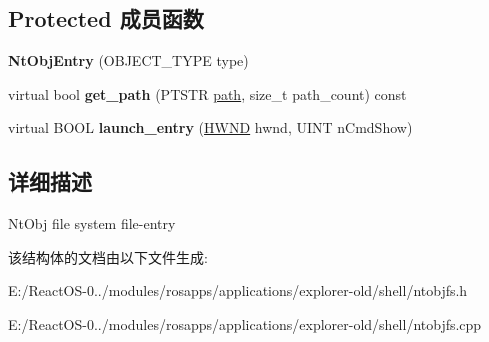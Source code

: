 \subsection*{Protected 成员函数}
\begin{DoxyCompactItemize}
\item 
\mbox{\label{struct_nt_obj_entry_a7ad617b6d6d55a019c480e8453e715b8}} 
{\bfseries Nt\+Obj\+Entry} (O\+B\+J\+E\+C\+T\+\_\+\+T\+Y\+PE type)
\item 
\mbox{\label{struct_nt_obj_entry_a9fe2f521ef737a936804bccd38aa57f4}} 
virtual bool {\bfseries get\+\_\+path} (P\+T\+S\+TR \hyperlink{structpath}{path}, size\+\_\+t path\+\_\+count) const
\item 
\mbox{\label{struct_nt_obj_entry_af3ce908d71093fe99eaf0b498d38ecb9}} 
virtual B\+O\+OL {\bfseries launch\+\_\+entry} (\hyperlink{interfacevoid}{H\+W\+ND} hwnd, U\+I\+NT n\+Cmd\+Show)
\end{DoxyCompactItemize}


\subsection{详细描述}
Nt\+Obj file system file-\/entry 

该结构体的文档由以下文件生成\+:\begin{DoxyCompactItemize}
\item 
E\+:/\+React\+O\+S-\/0../modules/rosapps/applications/explorer-\/old/shell/ntobjfs.\+h\item 
E\+:/\+React\+O\+S-\/0../modules/rosapps/applications/explorer-\/old/shell/ntobjfs.\+cpp\end{DoxyCompactItemize}
